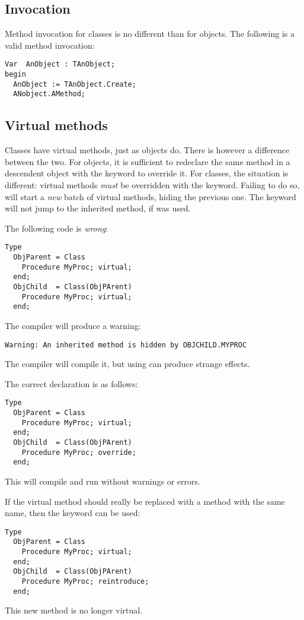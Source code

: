 \subsection{Invocation}
Method invocation for classes is no different than for objects. The
following is a valid method invocation:
\begin{verbatim}
Var  AnObject : TAnObject;
begin
  AnObject := TAnObject.Create;
  ANobject.AMethod;
\end{verbatim}


\subsection{Virtual methods}
Classes have virtual methods, just as objects do. There is however a
difference between the two. For objects, it is sufficient to redeclare the
same method in a descendent object with the keyword  to
override it. For classes, the situation is different: virtual methods 
{\em must} be overridden with the  keyword. Failing to do so,
will start a {\em new} batch of virtual methods, hiding the previous
one.  The  keyword will not jump to the inherited method, if
 was used.

The following code is {\em wrong}:
\begin{verbatim}
Type 
  ObjParent = Class
    Procedure MyProc; virtual;
  end;
  ObjChild  = Class(ObjPArent)
    Procedure MyProc; virtual;
  end;
\end{verbatim}
The compiler will produce a warning:
\begin{verbatim}
Warning: An inherited method is hidden by OBJCHILD.MYPROC
\end{verbatim}
The compiler will compile it, but using  can
produce strange effects.

The correct declaration is as follows:
\begin{verbatim}
Type 
  ObjParent = Class
    Procedure MyProc; virtual;
  end;
  ObjChild  = Class(ObjPArent)
    Procedure MyProc; override;
  end;
\end{verbatim}
This will compile and run without warnings or errors.

If the virtual method should really be replaced with a method with the 
same name, then the  keyword can be used: 
\begin{verbatim}
Type 
  ObjParent = Class
    Procedure MyProc; virtual;
  end;
  ObjChild  = Class(ObjPArent)
    Procedure MyProc; reintroduce;
  end;
\end{verbatim}
This new method is no longer virtual.

